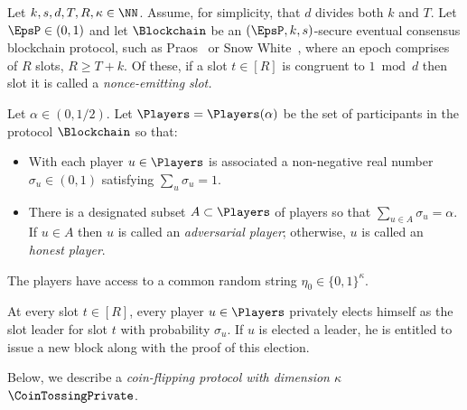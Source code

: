 


Let $k,s,d,T, R, \kappa \in \NN$. 
Assume, for simplicity, that $d$ divides both $k$ and $T$. 
Let $\EpsP \in (0,1)$ and 
let $\Blockchain$ be an $(\EpsP, k, s)$-secure eventual consensus blockchain protocol, 
such as Praos~\cite{Praos} or Snow White~\cite{SnowWhite}, 
where an epoch comprises of $R$ slots, $R \geq T + k$. 
Of these, if a slot $t \in [R]$ is congruent to  $1 \bmod d$ 
then slot it is called a \emph{nonce-emitting slot.} 

Let $\alpha \in (0, 1/2)$. 
Let $\Players = \Players(\alpha)$ be the set of participants 
in the protocol $\Blockchain$ so that: 
\begin{itemize}
	\item With each player $u \in \Players$ 
	is associated a non-negative real number $\sigma_u \in (0, 1)$ 
	satisfying $\sum_u \sigma_u = 1$. 

	\item There is a designated subset $A \subset \Players$ of players 
	so that 
	$\sum_{u \in A} \sigma_u = \alpha$. 
	If $u \in A$ then $u$ is called an \emph{adversarial player}; 
	otherwise, $u$ is called an \emph{honest player}.
\end{itemize}
The players have access to 
a common random string $\eta_0 \in \{0,1\}^\kappa$.

At every slot $t \in [R]$, 
every player $u \in \Players$ 
privately elects himself as the slot leader for slot $t$ 
with probability $\sigma_u$. 
If $u$ is elected a leader, 
he is entitled to issue a new block 
along with the proof of this election. 

Below, we describe a \emph{coin-flipping protocol with dimension $\kappa$} $\CoinTossingPrivate$. 


